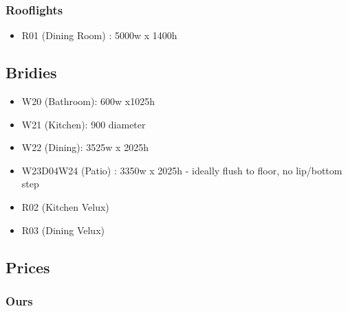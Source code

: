 \subsubsection{Rooflights}
\begin{itemize}
\item R01 (Dining Room) : 5000w x 1400h
\end{itemize}    

\subsection {Bridies}
\begin{itemize}
\item W20 (Bathroom): 600w x1025h
\item W21 (Kitchen): 900 diameter
\item W22 (Dining): 3525w x 2025h
\item W23D04W24 (Patio) : 3350w x 2025h - ideally flush to floor, no lip/bottom step
\item R02 (Kitchen Velux)
\item R03 (Dining Velux)
\end{itemize}

\subsection{Prices}
\subsubsection{Ours}


